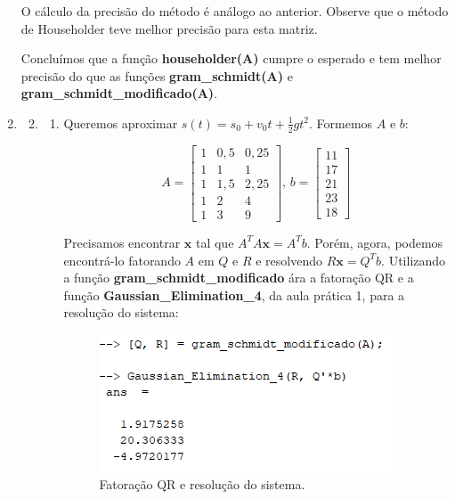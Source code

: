 \documentclass[11pt]{article}
\begin{document}
\begin{enumerate}
            O cálculo da precisão do método é análogo ao anterior. Observe que o método de Householder teve melhor precisão para esta matriz.
            
            Concluímos que a função \textbf{householder(A)} cumpre o esperado e tem melhor precisão do que as funções \textbf{gram\_schmidt(A)} e \textbf{gram\_schmidt\_modificado(A)}.
        
        \bigbreak
        
        \item %
        
            \begin{enumerate}[label=\arabic*)]
                \setcounter{enumii}{1}
                \item %
                
                \begin{enumerate}[label=\alph*)]
                    \item Queremos aproximar $s(t) = s_0 + v_0t + \frac{1}{2}gt^2$. Formemos $A$ e $b$:
                
                    $$A = \begin{bmatrix}
                    1& 0,5& 0,25\\
                    1& 1& 1\\
                    1& 1,5& 2,25\\
                    1& 2& 4\\
                    1& 3& 9
                    \end{bmatrix}\textrm{, }
                    b = \begin{bmatrix}
                    11\\
                    17\\
                    21\\
                    23\\
                    18
                    \end{bmatrix}$$
                    
                    Precisamos encontrar $\mathbf{x}$ tal que $A^TA\mathbf{x}=A^Tb$. Porém, agora, podemos encontrá-lo fatorando $A$ em $Q$ e $R$ e resolvendo $R\mathbf{x} = Q^Tb$. Utilizando a função \textbf{gram\_schmidt\_modificado} ára a fatoração QR e a função \textbf{Gaussian\_Elimination\_4}, da aula prática 1, para a resolução do sistema:
        
                    \begin{figure}[H]
                        \centering
                        \includegraphics[]{4-1}
                        \caption{Fatoração QR e resolução do sistema.}
                    \end{figure}
                    

\end{enumerate}
\end{enumerate}
\end{enumerate}
\end{document}
